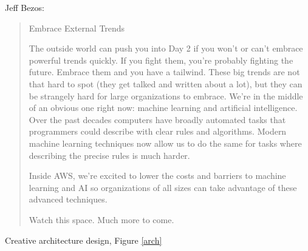 \documentclass[english]{article}
\begin{document}
Jeff Bezos:

\begin{quote}
Embrace External Trends

The outside world can push you into Day 2 if you won't or can't embrace powerful trends quickly. If you fight them, you're probably fighting the future.
Embrace them and you have a tailwind.
These big trends are not that hard to spot (they get talked and written about a lot), but they can be strangely hard for large organizations to embrace. We're in
the middle of an obvious one right now: machine learning and artificial intelligence.
Over the past decades computers have broadly automated tasks that programmers could describe with clear rules and algorithms. Modern machine learning
techniques now allow us to do the same for tasks where describing the precise rules is much harder.


Inside AWS, we're excited to lower the costs and barriers to machine learning and AI so organizations of all sizes can take advantage of these advanced techniques.

Watch this space. Much more to come.
\end{quote}

\item Creative architecture design, Figure \ref{arch}
\end{document}
